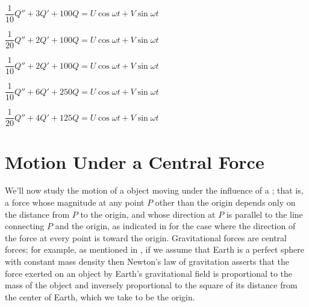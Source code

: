 \begin{exerciselist}

\item\label{exer:6.3.13}\Lex
$\dfrac{1}{10}Q''+3Q'+100Q=U\cos\omega t+V\sin\omega t$

\item\label{exer:6.3.14}\Lex
$\dfrac{1}{20}Q''+2Q'+100Q=U\cos\omega t+V\sin\omega t$

\item\label{exer:6.3.15}\Lex
$\dfrac{1}{10}Q''+2Q'+100Q=U\cos\omega t+V\sin\omega t$

\item\label{exer:6.3.16}\Lex
$\dfrac{1}{10}Q''+6Q'+250Q=U\cos\omega t+V\sin\omega t$

\item\label{exer:6.3.17}\Lex
$\dfrac{1}{20}Q''+4Q'+125Q=U\cos\omega t+V\sin\omega t$
\end{exerciselist}


\section{Motion Under a Central Force}\label{sec:central_force}

We'll now study the motion of a object moving under the influence
of a ; that is, a force whose magnitude at any
point $P$ other than the origin depends only on the distance from
$P$ to the origin, and whose direction at $P$ is parallel to the line
connecting $P$ and the origin, as indicated in
 for the case where the direction of the force
at every point is toward the origin.
 Gravitational forces are central
forces;   for example, as mentioned in , if we
assume that Earth is a perfect sphere with constant mass density then
Newton's law of gravitation asserts that the force exerted on an
object by Earth's gravitational field is proportional to the mass of
the object and inversely proportional to the square of its distance
from the center of Earth, which we take to be the origin.

